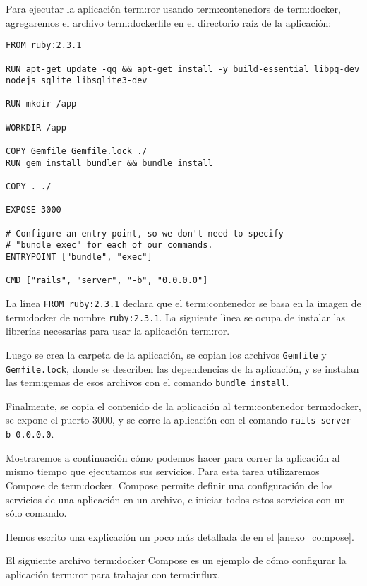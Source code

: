 Para ejecutar la aplicación \gls{term:ror} usando \glspl{term:contenedor} de
\gls{term:docker}, agregaremos el archivo \gls{term:dockerfile} en el directorio raíz de
la aplicación:

\begin{lstlisting}
FROM ruby:2.3.1

RUN apt-get update -qq && apt-get install -y build-essential libpq-dev nodejs sqlite libsqlite3-dev

RUN mkdir /app

WORKDIR /app

COPY Gemfile Gemfile.lock ./
RUN gem install bundler && bundle install

COPY . ./

EXPOSE 3000

# Configure an entry point, so we don't need to specify 
# "bundle exec" for each of our commands.
ENTRYPOINT ["bundle", "exec"]

CMD ["rails", "server", "-b", "0.0.0.0"]
\end{lstlisting}

La línea \lstinline{FROM ruby:2.3.1} declara que el \gls{term:contenedor} se basa en la
imagen de \gls{term:docker} de nombre \lstinline{ruby:2.3.1}. La siguiente
lìnea se ocupa de instalar las librerías necesarias para usar la aplicación
\gls{term:ror}.

Luego se crea la carpeta de la aplicación, se copian los archivos
\lstinline{Gemfile} y \lstinline{Gemfile.lock}, donde se describen las
dependencias de la aplicación, y se instalan las \glspl{term:gema} de esos
archivos con el comando \lstinline{bundle install}.

Finalmente, se copia el contenido de la aplicación al \gls{term:contenedor}
\gls{term:docker}, se expone el puerto 3000, y se corre la aplicación con el
comando \lstinline{rails server -b 0.0.0.0}.

Mostraremos a continuación cómo podemos hacer para correr la aplicación al
mismo tiempo que ejecutamos sus servicios. Para esta tarea utilizaremos Compose
de \gls{term:docker}. Compose permite definir una configuración de los
servicios de una aplicación en un archivo, e iniciar todos estos servicios con
un sólo comando.

Hemos escrito una explicación un poco más detallada de  en el
\autoref{anexo_compose}.

El siguiente archivo \gls{term:docker} Compose es un ejemplo de cómo configurar
la aplicación \gls{term:ror} para trabajar con \gls{term:influx}.

